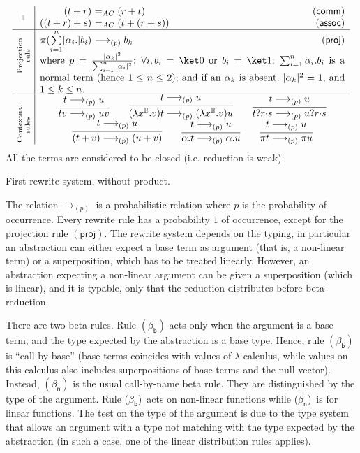 \documentclass[preprint]{elsarticle}
\newcommand\titulo[3][\scriptsize]{\rotatebox[origin=c]{90}{\parbox[t]{#2}{\centering #1{#3}}}}
\newcommand\lra[1][1]{\longrightarrow_{\left(#1\right)}}
\newcommand\lrap{\lra[p]}
\newcommand\B{\ensuremath{\mathbb B}}
\newcommand\ite[3]{{#1}?{#2}\mathord{\cdot}{#3}}
\newcommand\pair[2]{({#1}+{#2})}
\newcommand\s[1]{\ensuremath{\mathsf{#1}}}
\newcommand\may[1][\alpha]{[{#1}.]}
\newcommand\rbetab{(\s{\beta_b})}
\newcommand\rbetan{(\s{\beta_n})}
\newcommand\rproj{(\s{proj})}
\newcommand\rcomm{(\s{comm})}
\newcommand\rassoc{(\s{assoc})}
\begin{document}
\begin{table}
\[\begin{array}{c|r@{\ }lr}
      \multirow{2}{*}{\titulo{8.4mm}{=}}
      &\pair tr &=_{AC}\pair rt & \rcomm\\
      &\pair{\pair tr}s &=_{AC} \pair t{\pair rs} & \rassoc\\\hline
      \multirow{2}{*}{\titulo{15mm}{Projection rule}}
      &\pi(\sum\limits_{i=1}^n
        \may[\alpha_i]b_i)&\lrap
                            b_k & \rproj\\
      &\multicolumn{3}{c}{\parbox{11cm}{where
        $p=\frac{|\alpha_k|^2}{\sum_{i=1}^n|\alpha_i|^2}$;
        $\forall i, b_i=\ket 0$ or $b_i=\ket 1$;
        $\sum_{i=1}^n\alpha_i.b_i$ is a normal term (hence $1\leq n\leq 2$);
        and if an $\alpha_k$ is absent, $|\alpha_k|^2=1$, and $1\leq k\leq n$.
        }}\\\hline
      \multirow{2}{*}{\titulo{12.4mm}{Contextual rules}}
      &\multicolumn{3}{c}{
        \infer{tv\lrap uv}{t\lrap u}
        \qquad
        \infer{(\lambda x^\B.v)t\lrap(\lambda x^\B.v)u}{t\lrap u}
        \qquad
        \infer{\ite trs\lrap\ite urs}{t\lrap u}
        }\\
      &\multicolumn{3}{c}{
        \infer{\pair tv\lrap\pair uv}{t\lrap u}
        \qquad
        \infer{\alpha.t\lrap\alpha.u}{t\lrap u}
        \qquad
        \infer{\pi t\lrap\pi u}{t\lrap u}
        }
    \end{array}
  \]
  \centering
  All the terms are considered to be closed (i.e. reduction is weak).
  \caption{First rewrite system, without product.}
  \label{tab:RSNoX}
\end{table}
The relation $\lrap$ is a probabilistic relation where $p$ is the probability of
occurrence. Every rewrite rule has a probability $1$ of occurrence, except for
the projection rule $\rproj$. The rewrite system depends on the typing, in
particular an abstraction can either expect a base term as argument (that is, a
non-linear term) or a superposition, which has to be treated linearly. However,
an abstraction expecting a non-linear argument can be given a superposition
(which is linear), and it is typable, only that the reduction distributes before
beta-reduction.

There are two beta rules. Rule $\rbetab$ acts only when the argument is a base
term, and the type expected by the abstraction is a base type. Hence, rule
$\rbetab$ is ``call-by-base'' (base terms coincides with values of
$\lambda$-calculus, while values on this calculus also includes superpositions
of base terms and the null vector). Instead, $\rbetan$ is the usual call-by-name
beta rule. They are distinguished by the type of the argument. Rule \rbetab\
acts on non-linear functions while \rbetan\ is for linear functions. The test on
the type of the argument is due to the type system that allows an argument with
a type not matching with the type expected by the abstraction (in such a case,
one of the linear distribution rules applies).
\end{document}
